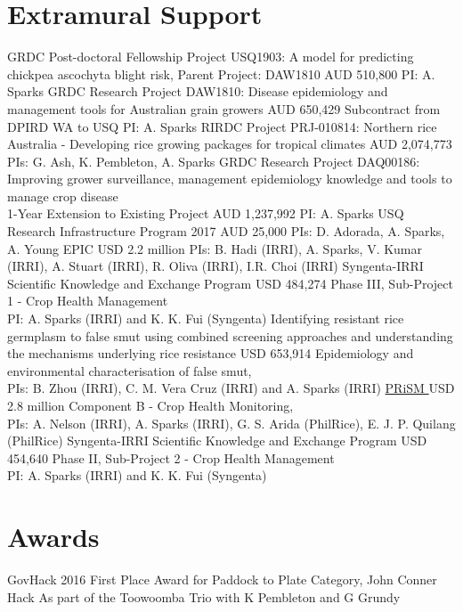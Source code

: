 \section*{Extramural Support}
  \begin{entrylist}
			{GRDC Post-doctoral Fellowship Project USQ1903: A model for predicting chickpea ascochyta blight risk, Parent Project: DAW1810}
			{AUD 510,800}
			{PI: A. Sparks}
			{GRDC Research Project DAW1810: Disease epidemiology and management tools for Australian grain growers}
			{AUD 650,429}
			{Subcontract from DPIRD WA to USQ PI: A. Sparks}
			{RIRDC Project PRJ-010814: Northern rice Australia - Developing rice growing packages for tropical climates}
			{AUD 2,074,773}
			{PIs: G. Ash, K. Pembleton, A. Sparks}
			{GRDC Research Project DAQ00186: Improving grower surveillance, management epidemiology knowledge and tools to manage crop disease\\1-Year Extension to Existing Project}
			{AUD 1,237,992}
			{PI: A. Sparks}
      {USQ Research Infrastructure Program 2017}
      {AUD 25,000}
      {PIs: D. Adorada, A. Sparks, A. Young}
      {EPIC }
      {USD 2.2 million}
      {PIs: B. Hadi (IRRI), A. Sparks, V. Kumar (IRRI), A. Stuart (IRRI), R. Oliva (IRRI), I.R. Choi (IRRI)}
	    {Syngenta-IRRI Scientific Knowledge and Exchange Program}
	    {USD 484,274}
	    {Phase III, Sub-Project 1 - Crop Health Management\\PI: A. Sparks (IRRI) and K. K. Fui (Syngenta)}
      {Identifying resistant rice germplasm to false smut using combined screening approaches and understanding the mechanisms underlying rice resistance}
      {USD 653,914}
      {Epidemiology and environmental characterisation of false smut,\\PIs: B. Zhou (IRRI), C. M. {Vera Cruz} (IRRI) and A. Sparks (IRRI)}
	    {\href{http://philippinericeinfo.ph/}{PRiSM }}
	    {USD 2.8 million}
	    {Component B - Crop Health Monitoring,\\PIs: A. Nelson (IRRI), A. Sparks (IRRI), G. S. Arida (PhilRice), E. J. P. Quilang (PhilRice)}
	    {Syngenta-IRRI Scientific Knowledge and Exchange Program}
	    {USD 454,640}
	    {Phase II, Sub-Project 2 - Crop Health Management\\PI: A. Sparks (IRRI) and K. K. Fui (Syngenta)}
\end{entrylist}

\section*{Awards}
  \begin{entrylist}
    {GovHack 2016 First Place Award for Paddock to Plate Category, John Conner Hack}
    {}
    {As part of the Toowoomba Trio with K Pembleton and G Grundy}
  \end{entrylist}
